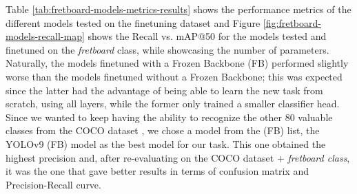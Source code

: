 \documentclass[10pt,twocolumn,letterpaper]{article}
\begin{document}
Table \ref{tab:fretboard-models-metrics-results} shows the performance metrics of the different models tested on the finetuning dataset \cite{guitar-necks-detector} and Figure \ref{fig:fretboard-models-recall-map} shows the Recall vs. mAP@50 for the models tested and finetuned on the \emph{fretboard} class, while showcasing the number of parameters. Naturally, the models finetuned with a Frozen Backbone (FB) performed slightly worse than the models finetuned without a Frozen Backbone; this was expected since the latter had the advantage of being able to learn the new task from scratch, using all layers, while the former only trained a smaller classifier head. Since we wanted to keep having the ability to recognize the other 80 valuable classes from the COCO dataset \cite{lin2015microsoftcococommonobjects}, we chose a model from the (FB) list, the YOLOv9 (FB) model as the best model for our task. This one obtained the highest precision and, after re-evaluating on the COCO dataset + \emph{fretboard class}, it was the one that gave better results in terms of confusion matrix and Precision-Recall curve.
\end{document}
